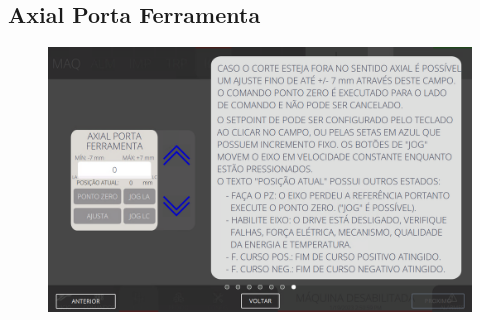 \newpage
\thispagestyle{fancy}
\vspace{\fill}
\subsection{Axial Porta Ferramenta}
\begin{figure}
    \centering
    \includegraphics[width=480 px,height=300 px]{src/imagesICV/06-dryCutter/settings/e-7.png}
\end{figure}
